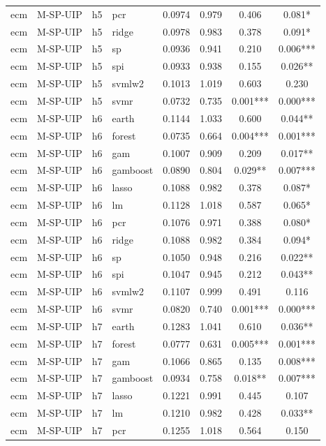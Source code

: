\begin{ThreePartTable}
\begin{longtable}[t]{llclcccc}
ecm & M-SP-UIP & h5 & pcr & 0.0974 & 0.979 & 0.406 & 0.081*\\
ecm & M-SP-UIP & h5 & ridge & 0.0978 & 0.983 & 0.378 & 0.091*\\
ecm & M-SP-UIP & h5 & sp & 0.0936 & 0.941 & 0.210 & 0.006***\\
ecm & M-SP-UIP & h5 & spi & 0.0933 & 0.938 & 0.155 & 0.026**\\
ecm & M-SP-UIP & h5 & svmlw2 & 0.1013 & 1.019 & 0.603 & 0.230\\
ecm & M-SP-UIP & h5 & svmr & 0.0732 & 0.735 & 0.001*** & 0.000***\\
\addlinespace
ecm & M-SP-UIP & h6 & earth & 0.1144 & 1.033 & 0.600 & 0.044**\\
ecm & M-SP-UIP & h6 & forest & 0.0735 & 0.664 & 0.004*** & 0.001***\\
ecm & M-SP-UIP & h6 & gam & 0.1007 & 0.909 & 0.209 & 0.017**\\
ecm & M-SP-UIP & h6 & gamboost & 0.0890 & 0.804 & 0.029** & 0.007***\\
ecm & M-SP-UIP & h6 & lasso & 0.1088 & 0.982 & 0.378 & 0.087*\\
ecm & M-SP-UIP & h6 & lm & 0.1128 & 1.018 & 0.587 & 0.065*\\
ecm & M-SP-UIP & h6 & pcr & 0.1076 & 0.971 & 0.388 & 0.080*\\
ecm & M-SP-UIP & h6 & ridge & 0.1088 & 0.982 & 0.384 & 0.094*\\
ecm & M-SP-UIP & h6 & sp & 0.1050 & 0.948 & 0.216 & 0.022**\\
ecm & M-SP-UIP & h6 & spi & 0.1047 & 0.945 & 0.212 & 0.043**\\
ecm & M-SP-UIP & h6 & svmlw2 & 0.1107 & 0.999 & 0.491 & 0.116\\
ecm & M-SP-UIP & h6 & svmr & 0.0820 & 0.740 & 0.001*** & 0.000***\\
\addlinespace
ecm & M-SP-UIP & h7 & earth & 0.1283 & 1.041 & 0.610 & 0.036**\\
ecm & M-SP-UIP & h7 & forest & 0.0777 & 0.631 & 0.005*** & 0.001***\\
ecm & M-SP-UIP & h7 & gam & 0.1066 & 0.865 & 0.135 & 0.008***\\
ecm & M-SP-UIP & h7 & gamboost & 0.0934 & 0.758 & 0.018** & 0.007***\\
ecm & M-SP-UIP & h7 & lasso & 0.1221 & 0.991 & 0.445 & 0.107\\
ecm & M-SP-UIP & h7 & lm & 0.1210 & 0.982 & 0.428 & 0.033**\\
ecm & M-SP-UIP & h7 & pcr & 0.1255 & 1.018 & 0.564 & 0.150\\

\end{longtable}
\end{ThreePartTable}
